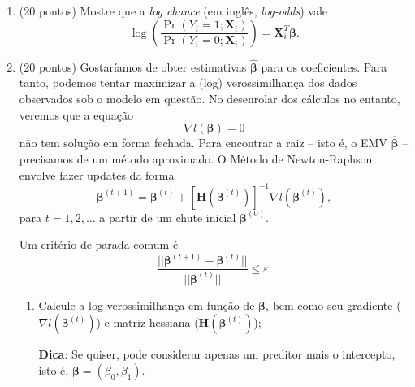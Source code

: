 \documentclass[a4paper,10pt, notitlepage]{report}
\newcommand{\pr}{\operatorname{Pr}} %
\begin{document}
\begin{enumerate}[label=\alph*)] 
 \item (20 pontos) Mostre que a \textit{log chance} (em inglês, \textit{log-odds}) vale
 \begin{equation*}
     \log\left(\frac{\pr(Y_i = 1; \boldsymbol{X}_i)}{\pr(Y_i = 0; \boldsymbol{X}_i)}\right) = \boldsymbol{X}_i^T\boldsymbol{\beta}.
 \end{equation*}
  \item (20 pontos) Gostaríamos de obter estimativas $\hat{\boldsymbol{\beta}}$ para os coeficientes.
  Para tanto, podemos tentar maximizar a (log) verossimilhança dos dados observados sob o modelo em questão.
  No desenrolar dos cálculos no entanto, veremos que a equação 
  \begin{equation*}
      \nabla l(\boldsymbol{\beta}) = 0
  \end{equation*}
não tem solução em forma fechada.
Para encontrar a raiz -- isto é, o EMV $\hat{\boldsymbol{\beta}}$ -- precisamos de um método aproximado.
O Método de Newton-Raphson envolve fazer updates da forma
\begin{equation*}
    \boldsymbol{\beta}^{(t + 1)} = \boldsymbol{\beta}^{(t)} + \left[\boldsymbol{H}(\boldsymbol{\beta}^{(t)})\right]^{-1}\nabla l(\boldsymbol{\beta}^{(t)}),
\end{equation*}
para $t = 1, 2, \ldots$ a partir de um chute inicial $\boldsymbol{\beta}^{(0)}$.

Um critério de parada comum é 
\begin{equation*}
    \frac{||\boldsymbol{\beta}^{(t + 1)} - \boldsymbol{\beta}^{(t)} ||}{||\boldsymbol{\beta}^{(t)}||} \leq \varepsilon.
\end{equation*}
  \begin{enumerate}
      \item Calcule a log-verossimilhança em função de $\boldsymbol{\beta}$, bem como seu gradiente ($\nabla l(\boldsymbol{\beta}^{(t)})$) e matriz hessiana ($\boldsymbol{H}(\boldsymbol{\beta}^{(t)})$);
      
      \textbf{Dica}: Se quiser, pode considerar apenas um preditor mais o intercepto, isto é, $\boldsymbol{\beta} = (\beta_0, \beta_1)$.
      

\end{enumerate}
\end{enumerate}
\end{document}
